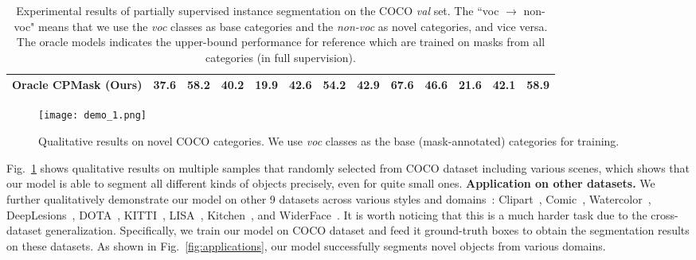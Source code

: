 \documentclass[runningheads]{llncs}
\begin{document}
\begin{table}[!t]
\begin{center}
{{\begin{tabular}{c|cccccc|cccccc}
					Oracle CPMask (Ours)   & {\color{gray}37.6} & {\color{gray}58.2} & {\color{gray}40.2} & {\color{gray}19.9} & {\color{gray}42.6} & {\color{gray}54.2} & {\color{gray}42.9} & {\color{gray}67.6} & {\color{gray}46.6}          &    {\color{gray}21.6}      & {\color{gray}42.1} & {\color{gray}58.9} \\
					\hline
		\end{tabular}}}
	\end{center}
	\vspace{-0.1in}
	\caption{Experimental results of partially supervised instance segmentation on the COCO {\it val} set. The ``voc $\rightarrow$ non-voc" means that we use the \emph{voc} classes as base categories and the \emph{non-voc} as novel categories, and vice versa. The oracle models indicates the upper-bound performance for reference which are trained on masks from all categories (in full supervision).} \label{table:partially}
	\vspace{-0.23in}
\end{table}

 \begin{figure}[!t]
 	\centering
\texttt{[image: demo\_1.png]}
 	\vspace{-0.1in}
 	\caption{Qualitative results on novel COCO categories. We use \emph{voc} classes as the base (mask-annotated) categories for training. }
 	\label{fig:coco}
 	\vspace{-0.3in}
 \end{figure}

 Fig.~\ref{fig:coco} shows qualitative results on multiple samples that randomly selected from COCO dataset including various scenes, which shows that our model is able to segment all different kinds of objects precisely, even for quite small ones. 
\noindent\textbf{Application on other datasets.} We further qualitatively demonstrate our model on other 9 datasets across various styles and domains~\cite{wang2019towards}:  Clipart~\cite{inoue2018cross}, Comic~\cite{inoue2018cross}, Watercolor~\cite{inoue2018cross},  DeepLesions~\cite{yan2018deep}, DOTA~\cite{xia2018dota},  KITTI~\cite{geiger2012we}, LISA~\cite{mogelmose2012vision}, Kitchen~\cite{georgakis2016multiview}, and WiderFace~\cite{yang2016wider}. It is worth noticing that this is a much harder task due to the cross-dataset generalization. Specifically, we train our model on COCO dataset and feed it ground-truth boxes to obtain the segmentation results on these datasets. As shown in Fig.~\ref{fig:applications}, our model successfully segments novel objects from various domains. 
\end{document}
